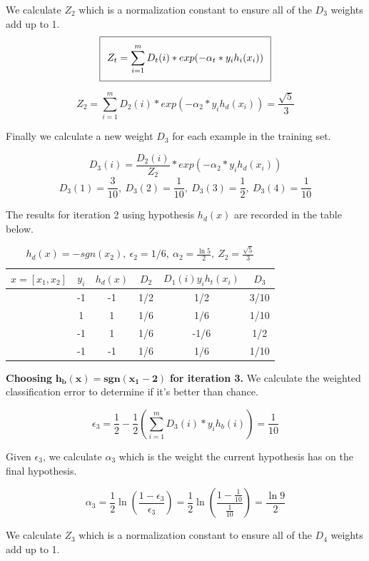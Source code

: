 \documentclass[11pt]{article}
\begin{document}
We calculate $Z_2$ which is a normalization constant to ensure all of the $D_3$ weights add up to 1.
\begin{equation}
\setlength\fboxsep{0.25cm}
\setlength\fboxrule{0.4pt}
\boxed{Z_t = \sum_{i = 1}^m D_t(i) * exp(-\alpha_t * y_ih_i(x_i))}
\end{equation}

$$Z_2 = \sum_{i = 1}^m D_2(i) * exp(-\alpha_2 * y_ih_d(x_i)) = \frac{\sqrt{5}}{3}$$

Finally we calculate a new weight $D_3$ for each example in the training set.

$$D_{3}(i) = \frac{D_2(i)}{Z_2} * exp(-\alpha_2 * y_ih_d(x_i))$$
$$D_3(1) = \frac{3}{10}, \ D_3(2) = \frac{1}{10}, \ D_3(3) = \frac{1}{2}, \ D_3(4) = \frac{1}{10} $$

The results for iteration 2 using hypothesis $h_d(x)$ are recorded in the table below.

\begin{table}[H]
\centering
{\renewcommand{\arraystretch}{1.2}%
\begin{tabular}{| c | c | c | c | c | c |}
\hline
$x = [x_1, x_2]$& $y_i$ & $h_d(x)$ & $D_2$ & $D_1(i)y_ih_t(x_i)$ & $D_3$\\
\hline
[1,1] & -1 & -1 & 1/2 &  1/2& 3/10\\ \hline
[1,-1] & 1 &  1&  1/6&  1/6& 1/10\\ \hline
[-1,-1] & -1 & 1 & 1/6&  -1/6& 1/2\\ \hline
[-1,1] & -1 & -1 &  1/6&  1/6& 1/10\\ \hline
\end{tabular}}
\caption{$h_d(x) = -sgn(x_2), \ \epsilon_2 = 1/6, \ \alpha_2 = \frac{\ln5}{2}, \ Z_2 = \frac{\sqrt{5}}{3}$}
\end{table}

\textbf{Choosing} $\mathbf{h_b(x) = sgn(x_1 - 2)}$ \textbf{for iteration 3.} We calculate the weighted classification error to determine if it's better than chance.

$$\epsilon_3 = \frac{1}{2} - \frac{1}{2}(\sum_{i=1}^m D_3(i)*y_ih_b(i)) = \frac{1}{10}$$

Given $\epsilon_3$, we calculate $\alpha_3$ which is the weight the current hypothesis has on the final hypothesis.

$$\alpha_3 = \frac{1}{2}\ln(\frac{1 - \epsilon_3}{\epsilon_3}) = \frac{1}{2}\ln(\frac{1 - \frac{1}{10}}{\frac{1}{10}}) = \frac{\ln9}{2}$$

We calculate $Z_3$ which is a normalization constant to ensure all of the $D_4$ weights add up to 1.
\end{document}
